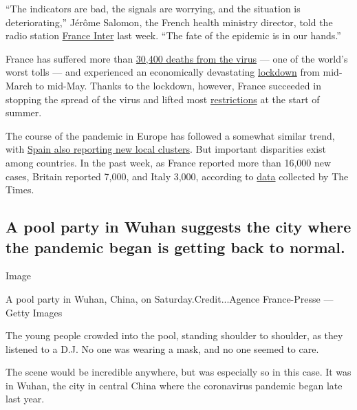 ``The indicators are bad, the signals are worrying, and the situation is
deteriorating,'' Jérôme Salomon, the French health ministry director,
told the radio station
\href{https://www.franceinter.fr/emissions/l-invite-de-8h20-le-grand-entretien/l-invite-de-8h20-le-grand-entretien-14-aout-2020}{France
Inter} last week. ``The fate of the epidemic is in our hands.''

France has suffered more than
\href{https://www.nytimes3xbfgragh.onion/interactive/2020/world/europe/france-coronavirus-cases.html}{30,400
deaths from the virus} --- one of the world's worst tolls --- and
experienced an economically devastating
\href{https://www.nytimes3xbfgragh.onion/2020/03/17/world/europe/paris-coronavirus-lockdown.html?searchResultPosition=18}{lockdown}
from mid-March to mid-May. Thanks to the lockdown, however, France
succeeded in stopping the spread of the virus and lifted most
\href{https://www.nytimes3xbfgragh.onion/2020/05/28/world/europe/france-coronavirus-lockdown-aperue.html?searchResultPosition=4}{restrictions}
at the start of summer.

The course of the pandemic in Europe has followed a somewhat similar
trend, with
\href{https://www.nytimes3xbfgragh.onion/2020/07/23/world/europe/spain-coronavirus-reopening.html}{Spain
also reporting new local clusters}. But important disparities exist
among countries. In the past week, as France reported more than 16,000
new cases, Britain reported 7,000, and Italy 3,000, according to
\href{https://www.nytimes3xbfgragh.onion/interactive/2020/world/coronavirus-maps.html\#countries}{data}
collected by The Times.

\hypertarget{a-pool-party-in-wuhan-suggests-the-city-where-the-pandemic-began-is-getting-back-to-normal}{%
\subsection{A pool party in Wuhan suggests the city where the pandemic
began is getting back to
normal.}\label{a-pool-party-in-wuhan-suggests-the-city-where-the-pandemic-began-is-getting-back-to-normal}}

Image

A pool party in Wuhan, China, on Saturday.Credit...Agence France-Presse
--- Getty Images

The young people crowded into the pool, standing shoulder to shoulder,
as they listened to a D.J. No one was wearing a mask, and no one seemed
to care.

The scene would be incredible anywhere, but was especially so in this
case. It was in Wuhan, the city in central China where the coronavirus
pandemic began late last year.


